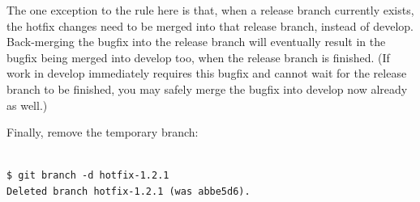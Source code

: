 The one exception to the rule here is that, when a release branch currently
exists, the hotfix changes need to be merged into that release branch, instead of
develop. Back-merging the bugfix into the release branch will eventually result
in the bugfix being merged into develop too, when the release branch is finished.
(If work in develop immediately requires this bugfix and cannot wait for the
release branch to be finished, you may safely merge the bugfix into develop now
already as well.)

Finally, remove the temporary branch:\\\\
\begin{verbatim}
$ git branch -d hotfix-1.2.1
Deleted branch hotfix-1.2.1 (was abbe5d6).
\end{verbatim}
